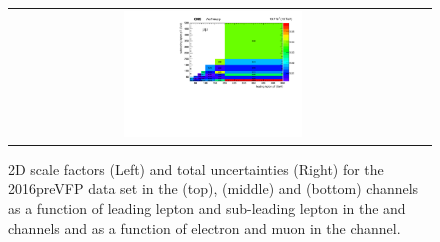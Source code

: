 \begin{figure}[!htb]
\begin{center}
\begin{tabular}{cc}
      \includegraphics[width=0.45\textwidth]{fig_2016preVFP_TrigSF/h2D_lepABpt_mumu_BinErrors.pdf}\\
    \end{tabular}
    \caption{2D scale factors (Left) and total uncertainties (Right) for the 2016preVFP data set in the \emu (top), \ee (middle) and \mumu (bottom) channels as a function of leading lepton \pT and sub-leading lepton \pT in the \ee and \mumu channels and as a function of electron \pT and muon \pT in the \emu channel.}
    \label{TrigSF_2016preVFP_4}
  \end{center}
\end{figure}

